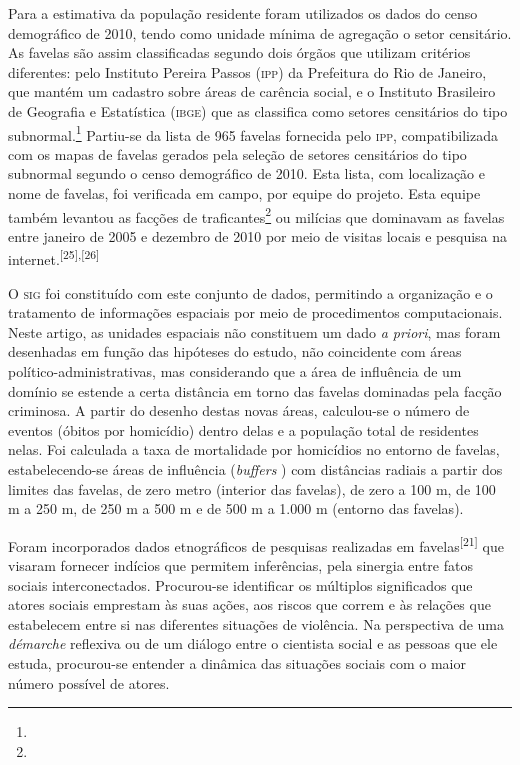 \documentclass{article}
\begin{document}
Para a estimativa da população residente foram utilizados os dados do censo
demográfico de 2010, tendo como unidade mínima de agregação o setor censitário.
As favelas são assim classificadas segundo dois órgãos que utilizam critérios
diferentes: pelo Instituto Pereira Passos (\textsc{ipp}) da Prefeitura do Rio de Janeiro,
que mantém um cadastro sobre áreas de carência social, e o Instituto Brasileiro
de Geografia e Estatística (\textsc{ibge}) que as classifica como setores censitários do
tipo subnormal.\footnote{}
Partiu-se da lista de 965 favelas fornecida pelo \textsc{ipp}, compatibilizada com os
mapas de favelas gerados pela seleção de setores censitários do tipo subnormal
segundo o censo demográfico de 2010. Esta lista, com localização e nome de
favelas, foi verificada em campo, por equipe do projeto. Esta equipe também
levantou as facções de traficantes\footnote{}
ou milícias que dominavam as favelas entre janeiro de 2005 e dezembro de 2010
por meio de visitas locais e pesquisa na
internet.\textsuperscript{[}\textsuperscript{25}\textsuperscript{]}\textsuperscript{,}\textsuperscript{[}\textsuperscript{26}\textsuperscript{]}

O \textsc{sig} foi constituído com este conjunto de dados, permitindo a organização e o
tratamento de informações espaciais por meio de procedimentos computacionais.
Neste artigo, as unidades espaciais não constituem um dado \textit{a priori}, mas foram desenhadas em função das hipóteses do estudo, não coincidente com
áreas político-administrativas, mas considerando que a área de influência de um
domínio se estende a certa distância em torno das favelas dominadas pela facção
criminosa. A partir do desenho destas novas áreas, calculou-se o número de
eventos (óbitos por homicídio) dentro delas e a população total de residentes
nelas. Foi calculada a taxa de mortalidade por homicídios no entorno de favelas,
estabelecendo-se áreas de influência (\textit{buffers}
) com distâncias radiais a partir dos limites das favelas, de zero metro
(interior das favelas), de zero a 100 m, de 100 m a 250 m, de 250 m a 500 m e de
500 m a 1.000 m (entorno das favelas).

Foram incorporados dados etnográficos de pesquisas realizadas em
favelas\textsuperscript{[}\textsuperscript{21}\textsuperscript{]}
que visaram fornecer indícios que permitem inferências, pela sinergia entre
fatos sociais interconectados. Procurou-se identificar os múltiplos significados
que atores sociais emprestam às suas ações, aos riscos que correm e às relações
que estabelecem entre si nas diferentes situações de violência. Na perspectiva
de uma \textit{démarche}
reflexiva ou de um diálogo entre o cientista social e as pessoas que ele estuda,
procurou-se entender a dinâmica das situações sociais com o maior número
possível de atores.
\end{document}

